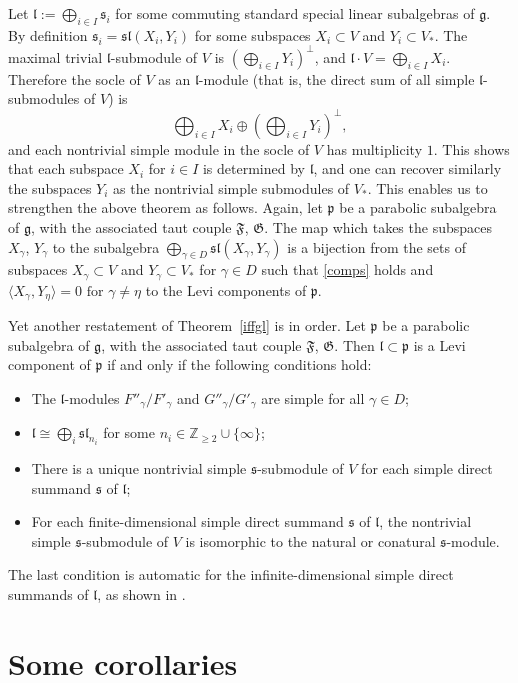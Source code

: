 \documentclass{amsart}
\theoremstyle{definition}
\theoremstyle{remark}
\numberwithin{equation}{section}
\newcommand {\Z} {\mathbb{Z}}
\def\g{\mathfrak {g}}
\def\l{\mathfrak {l}}
\def\p{\mathfrak {p}}
\def\sl{\mathfrak{sl}}
\def\s{\mathfrak{s}}
\def\F{\mathfrak{F}}
\def\G{\mathfrak{G}}
\begin{document}
Let $\l := \bigoplus_{i \in I} \s_i$ for some commuting standard special linear subalgebras of $\g$.  By definition $\s_i = \sl(X_i , Y_i)$ for some subspaces $X_i \subset V$ and $Y_i \subset V_*$.  The maximal trivial $\l$-submodule of $V$ is $(\bigoplus_{i \in I} Y_i)^\perp$, and $\l \cdot V = \bigoplus_{i \in I} X_i$.  Therefore the socle of $V$ as an $\l$-module (that is, the direct sum of all simple $\l$-submodules of $V$) is 
$$\bigoplus_{i \in I} X_i \oplus (\bigoplus_{i \in I} Y_i)^\perp,$$ and each nontrivial simple module in the socle of $V$ has multiplicity $1$.  This shows that each subspace $X_i$ for $i \in I$ is determined by $\l$, and one can recover similarly the subspaces $Y_i$ as the nontrivial simple submodules of $V_*$. 
This enables us to strengthen the above theorem as follows.  Again, let $\p$ be a parabolic subalgebra of $\g$, with the associated taut couple $\F$, $\G$.  The map which takes the subspaces $X_\gamma$, $Y_\gamma$ to the subalgebra $\bigoplus_{\gamma \in D} \sl(X_\gamma, Y_\gamma)$ is a bijection from the sets of subspaces $X_\gamma \subset V$ and $Y_\gamma \subset V_*$ for $\gamma \in D$ such that \eqref{comps} holds and
 $\langle X_\gamma , Y_\eta \rangle = 0 \textrm{ for } \gamma \neq \eta$ to the Levi components of $\p$.

Yet another restatement of Theorem~\ref{iffgl} is in order.  Let $\p$ be a parabolic subalgebra of $\g$, with the associated taut couple $\F$, $\G$.  Then $\l \subset \p$ is a Levi component of $\p$ if and only if the following conditions hold:
\begin{itemize}
\item The $\l$-modules $F''_\gamma / F'_\gamma$ and $G''_\gamma / G'_\gamma$ are simple for all $\gamma \in D$;
\item $\l \cong \bigoplus_i \sl_{n_i}$ for some $n_i \in  \Z_{\geq 2} \cup \{ \infty \}$;
\item  There is a unique nontrivial simple $\s$-submodule of $V$ for each simple direct summand $\s$ of $\l$;
\item For each finite-dimensional simple direct summand $\s$ of $\l$, the nontrivial simple $\s$-submodule of $V$ is isomorphic to the natural or conatural $\s$-module.
\end{itemize}
 The last condition is automatic for the infinite-dimensional simple direct summands of $\l$, as shown in \cite{DimitrovP2}.
 
 
\section{Some corollaries} \label{corollaries}
\end{document}
